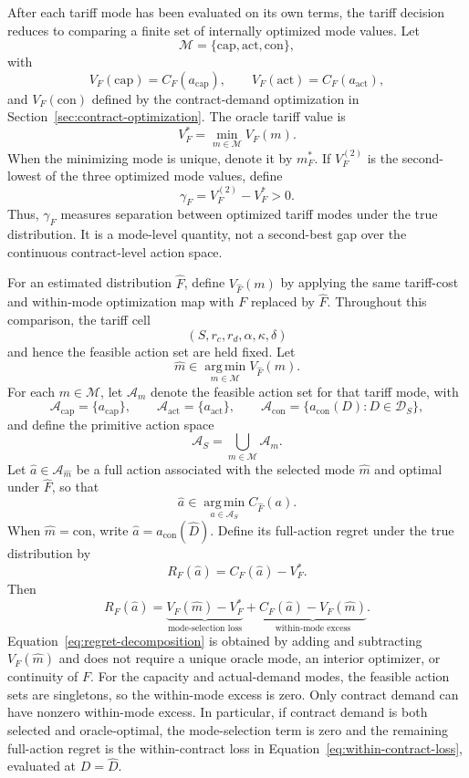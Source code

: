\documentclass[Times1COL]{WileyNJDv5}
\begin{document}
After each tariff mode has been evaluated on its own terms, the tariff decision reduces to comparing a finite set of internally optimized mode values. Let
\[
\mathcal{M}
=
\{\mathrm{cap},\mathrm{act},\mathrm{con}\},
\]
with
\[
V_F(\mathrm{cap})
=
C_F(a_{\mathrm{cap}}),
\qquad
V_F(\mathrm{act})
=
C_F(a_{\mathrm{act}}),
\]
and $V_F(\mathrm{con})$ defined by the contract-demand optimization in Section~\ref{sec:contract-optimization}. The oracle tariff value is
\[
V_F^\ast
=
\min_{m\in\mathcal M}V_F(m).
\]
When the minimizing mode is unique, denote it by $m_F^\ast$. If $V_F^{(2)}$ is the second-lowest of the three optimized mode values, define
\begin{equation}
\label{eq:mode-gap}
\gamma_F
=
V_F^{(2)}-V_F^\ast
>
0.
\end{equation}
Thus, $\gamma_F$ measures separation between optimized tariff modes under the true distribution. It is a mode-level quantity, not a second-best gap over the continuous contract-level action space.

For an estimated distribution $\widehat F$, define $V_{\widehat F}(m)$ by applying the same tariff-cost and within-mode optimization map with $F$ replaced by $\widehat F$. Throughout this comparison, the tariff cell
\[
(S,r_c,r_d,\alpha,\kappa,\delta)
\]
and hence the feasible action set are held fixed. Let
\[
\widehat m
\in
\operatorname*{arg\,min}_{m\in\mathcal M}
V_{\widehat F}(m).
\]
For each $m\in\mathcal M$, let $\mathcal A_m$ denote the feasible
action set for that tariff mode, with
\[
\mathcal A_{\mathrm{cap}}=\{a_{\mathrm{cap}}\},
\qquad
\mathcal A_{\mathrm{act}}=\{a_{\mathrm{act}}\},
\qquad
\mathcal A_{\mathrm{con}}
=
\{a_{\mathrm{con}}(D):D\in\mathcal D_S\},
\]
and define the primitive action space
\[
\mathcal A_S
=
\bigcup_{m\in\mathcal M}\mathcal A_m.
\]
Let $\widehat a\in\mathcal A_{\widehat m}$ be a full action associated
with the selected mode $\widehat m$ and optimal under $\widehat F$,
so that
\[
\widehat a
\in
\operatorname*{arg\,min}_{a\in\mathcal A_S}
C_{\widehat F}(a).
\]
When $\widehat m=\mathrm{con}$, write
$\widehat a=a_{\mathrm{con}}(\widehat D)$. Define its full-action
regret under the true distribution by
\[
R_F(\widehat a)
=
C_F(\widehat a)-V_F^\ast.
\]
Then
\begin{equation}
\label{eq:regret-decomposition}
R_F(\widehat a)
=
\underbrace{
V_F(\widehat m)-V_F^\ast
}_{\text{mode-selection loss}}
+
\underbrace{
C_F(\widehat a)-V_F(\widehat m)
}_{\text{within-mode excess}}.
\end{equation}
Equation~\eqref{eq:regret-decomposition} is obtained by adding and
subtracting $V_F(\widehat m)$ and does not require a unique oracle
mode, an interior optimizer, or continuity of $F$. For the capacity
and actual-demand modes, the feasible action sets are singletons, so
the within-mode excess is zero. Only contract demand can have
nonzero within-mode excess. In particular, if contract demand is both
selected and oracle-optimal, the mode-selection term is zero and the
remaining full-action regret is the within-contract loss in
Equation~\eqref{eq:within-contract-loss}, evaluated at
$D=\widehat D$.
\end{document}
